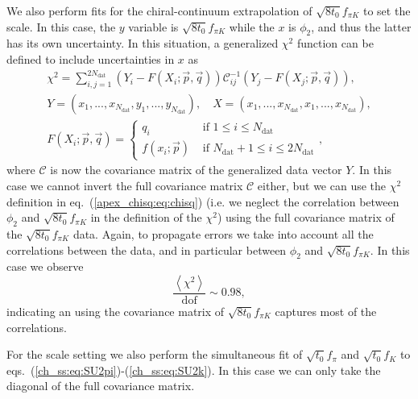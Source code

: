 We also perform fits for the chiral-continuum extrapolation of $\sqrt{8t_0}f_{\pi K}$ to set the scale. In this case, the $y$ variable is $\sqrt{8t_0}f_{\pi K}$ while the $x$ is $\phi_2$, and thus the latter has its own uncertainty. In this situation, a generalized $\chi^2$ function can be defined to include uncertainties in $x$ as
\begin{gather}
\label{apex_chisq:eq:chisq_generalized}
\chi^2=\sum_{i,j=1}^{2N_{\textrm{dat}}}\left(Y_i-F(X_i;\vec{p},\vec{q})\right)\mathcal{C}_{ij}^{-1}\left(Y_j-F(X_j;\vec{p},\vec{q})\right), \\
Y=(x_1,...,x_{N_{\textrm{dat}}},y_1,...,y_{N_{\textrm{dat}}}), \quad
X=(x_1,...,x_{N_{\textrm{dat}}},x_1,...,x_{N_{\textrm{dat}}}), \\
F(X_i;\vec{p},\vec{q})=\left\{\begin{matrix}
q_i & \textrm{ if $1\leq i\leq N_{\textrm{dat}}$} \\ 
f(x_i;\vec{p}) & \textrm{ if $N_{\textrm{dat}}+1\leq i\leq 2N_{\textrm{dat}}$}
\end{matrix}\right.,
\end{gather}
where $\mathcal{C}$ is now the covariance matrix of the generalized data vector $Y$. In this case we cannot invert the full covariance matrix $\mathcal{C}$ either, but we can use the $\chi^2$ definition in eq.~(\ref{apex_chisq:eq:chisq}) (i.e. we neglect the correlation between $\phi_2$ and $\sqrt{8t_0}f_{\pi K}$ in the definition of the $\chi^2$) using the full covariance matrix of the $\sqrt{8t_0}f_{\pi K}$ data. Again, to propagate errors we take into account all the correlations between the data, and in particular between $\phi_2$ and $\sqrt{8t_0}f_{\pi K}$. In this case we observe
\begin{equation}
\frac{\left<\chi^2\right>}{{\textrm{dof}}}\sim0.98,
\end{equation}
indicating an using the covariance matrix of $\sqrt{8t_0}f_{\pi K}$ captures most of the correlations.

For the scale setting we also perform the simultaneous fit of $\sqrt{t_0}f_{\pi}$ and $\sqrt{t_0}f_K$ to eqs.~(\ref{ch_ss:eq:SU2pi})-(\ref{ch_ss:eq:SU2k}). In this case we can only take the diagonal of the full covariance matrix.



